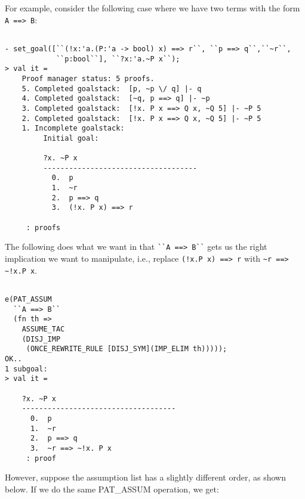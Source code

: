For example, consider the following case where we have two terms with
the form \verb|A ==> B|:
\begin{session}
  \begin{scriptsize}
\begin{verbatim}

- set_goal([``(!x:'a.(P:'a -> bool) x) ==> r``, ``p ==> q``,``~r``, 
            ``p:bool``], ``?x:'a.~P x``);
> val it =
    Proof manager status: 5 proofs.
    5. Completed goalstack:  [p, ~p \/ q] |- q
    4. Completed goalstack:  [~q, p ==> q] |- ~p
    3. Completed goalstack:  [!x. P x ==> Q x, ~Q 5] |- ~P 5
    2. Completed goalstack:  [!x. P x ==> Q x, ~Q 5] |- ~P 5
    1. Incomplete goalstack:
         Initial goal:
         
         ?x. ~P x
         ------------------------------------
           0.  p
           1.  ~r
           2.  p ==> q
           3.  (!x. P x) ==> r
         
     : proofs
\end{verbatim}
  \end{scriptsize}
\end{session}
The following does what we want in that \verb|``A ==> B``| gets us the
right implication we want to manipulate, i.e., replace
\verb|(!x.P x) ==> r| with \verb|~r ==> ~!x.P x|.
\begin{session}
  \begin{scriptsize}
\begin{verbatim}

e(PAT_ASSUM 
  ``A ==> B`` 
  (fn th => 
    ASSUME_TAC 
    (DISJ_IMP 
     (ONCE_REWRITE_RULE [DISJ_SYM](IMP_ELIM th)))));
OK..
1 subgoal:
> val it =
    
    ?x. ~P x
    ------------------------------------
      0.  p
      1.  ~r
      2.  p ==> q
      3.  ~r ==> ~!x. P x
     : proof
\end{verbatim}
  \end{scriptsize}
\end{session}
However, suppose the assumption list has a slightly different order,
as shown below. If we do the same PAT\_ASSUM operation, we get:
